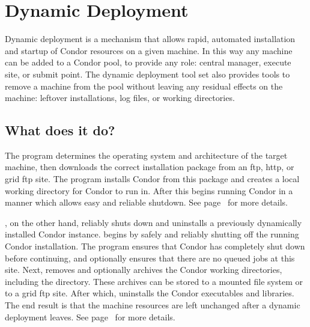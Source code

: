 \section{\label{sec:Dynamic-Deployment}Dynamic Deployment}

Dynamic deployment is a mechanism that allows rapid, automated
installation and startup of Condor resources on a given machine.  In
this way any machine can be added to a Condor pool, to provide any
role: central manager, execute site, or submit point.  The dynamic
deployment tool set also provides tools to remove a machine from the
pool without leaving any residual effects on the machine: leftover
installations, log files, or working directories.

\subsection{What does it do?}

The  program determines the operating system and
architecture of the target machine, then downloads the correct
installation package from an ftp, http, or grid ftp site.  The program
installs Condor from this package and creates a local working
directory for Condor to run in.  After this 
begins running Condor in a manner which allows easy and reliable
shutdown.  See page~\pageref{man-condor-cold-start} for more details.

, on the other hand, reliably shuts down and
uninstalls a previously dynamically installed Condor instance.
 begins by safely and reliably shutting off the
running Condor installation.  The program ensures that Condor has
completely shut down before continuing, and optionally ensures that
there are no queued jobs at this site.  Next, 
removes and optionally archives the Condor working directories,
including the  directory.  These archives can be stored to a
mounted file system or to a grid ftp site.  After which,
 uninstalls the Condor executables and libraries.
The end result is that the machine resources are left unchanged after
a dynamic deployment leaves.  See page~\pageref{man-condor-cold-stop}
for more details.

